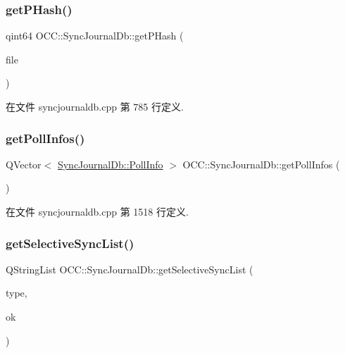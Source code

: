 \subsubsection{\texorpdfstring{get\+P\+Hash()}{getPHash()}}
{\footnotesize\ttfamily qint64 O\+C\+C\+::\+Sync\+Journal\+Db\+::get\+P\+Hash (\begin{DoxyParamCaption}\item[{const Q\+String \&}]{file }\end{DoxyParamCaption})\hspace{0.3cm}{\ttfamily [static]}}



在文件 syncjournaldb.\+cpp 第 785 行定义.

\mbox{\label{class_o_c_c_1_1_sync_journal_db_adc7300cb856925824df1fa51c2dda4b4}} 
\subsubsection{\texorpdfstring{get\+Poll\+Infos()}{getPollInfos()}}
{\footnotesize\ttfamily Q\+Vector$<$ \hyperlink{struct_o_c_c_1_1_sync_journal_db_1_1_poll_info}{Sync\+Journal\+Db\+::\+Poll\+Info} $>$ O\+C\+C\+::\+Sync\+Journal\+Db\+::get\+Poll\+Infos (\begin{DoxyParamCaption}{ }\end{DoxyParamCaption})}



在文件 syncjournaldb.\+cpp 第 1518 行定义.

\mbox{\label{class_o_c_c_1_1_sync_journal_db_a82c108d27041377d63d12dea53ac7d00}} 
\subsubsection{\texorpdfstring{get\+Selective\+Sync\+List()}{getSelectiveSyncList()}}
{\footnotesize\ttfamily Q\+String\+List O\+C\+C\+::\+Sync\+Journal\+Db\+::get\+Selective\+Sync\+List (\begin{DoxyParamCaption}\item[{\hyperlink{class_o_c_c_1_1_sync_journal_db_ad028daa35155c92ce2e3863602f9feeb}{Sync\+Journal\+Db\+::\+Selective\+Sync\+List\+Type}}]{type,  }\item[{bool $\ast$}]{ok }\end{DoxyParamCaption})}



